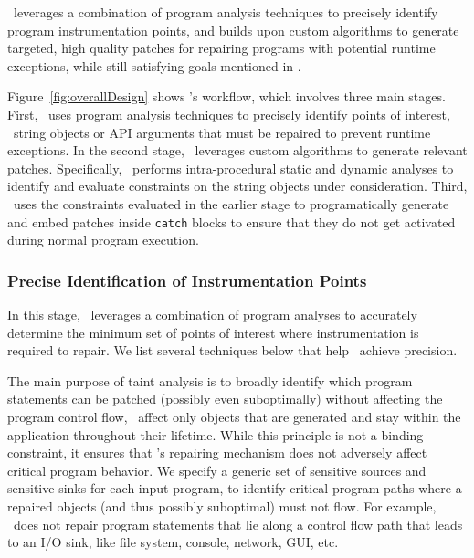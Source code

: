  \tool\ leverages a combination of program 
analysis techniques to precisely identify program instrumentation points, and
builds upon custom algorithms to generate targeted, high quality patches for
repairing programs with potential runtime exceptions, while still satisfying
goals mentioned in .

Figure~\ref{fig:overallDesign} shows \tool's workflow, which involves three
main stages. First, \tool\ uses program analysis techniques to precisely
identify points of interest, \ie\ string objects or API arguments that must be
repaired to prevent runtime exceptions. In the second stage, \tool\ leverages
custom algorithms to generate relevant patches. Specifically, \tool\ performs
intra-procedural static and dynamic analyses to identify and evaluate
constraints on the string objects under consideration. Third, \tool\ uses the
constraints evaluated in the earlier stage to programatically generate and embed
patches inside \texttt{catch} blocks to ensure that they do not get activated
during normal program execution.

\subsubsection{Precise Identification of Instrumentation Points}
\label{sec:tool:stage1}

In this stage, \tool\ leverages a combination of program analyses to accurately
determine the minimum set of points of interest where instrumentation is
required to repair. We list several techniques below that help \tool\ achieve
precision.

 The main purpose of taint analysis is to
broadly identify which program statements can be patched (possibly even
suboptimally) without affecting the program control flow, \ie\ affect only
objects that are generated and stay within the application throughout their
lifetime. While this principle is not a binding constraint, it ensures that
\tool's repairing mechanism does not adversely affect critical program behavior.
We specify a generic set of sensitive sources and sensitive sinks for each input
program, to identify critical program paths where a repaired 
objects (and thus possibly suboptimal) must not flow. For example, \tool\ does
not repair program statements that lie along a control flow path that leads to
an I/O sink, like file system, console, network, GUI, etc.

